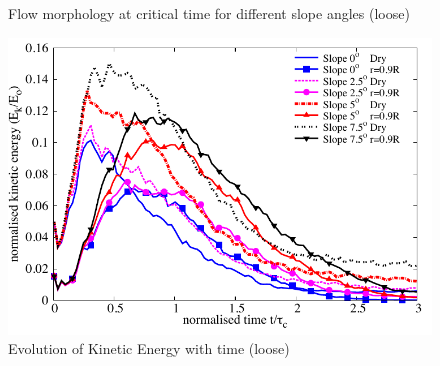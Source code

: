 \documentclass[12pt,a4paper,twocolumn,fleqn]{NARMS}
\begin{document}
\begin{figure}[hb]
 \\
 \\
\caption{Flow morphology at critical time for different slope angles (loose)}
\label{fig:slope_loose}
\end{figure}

\begin{figure}
\centering
\includegraphics[width=0.97\columnwidth]{figs/KE_loose.pdf}
\caption{Evolution of Kinetic Energy with time (loose)}
\label{fig:KE_loose}
\end{figure}
\end{document}
